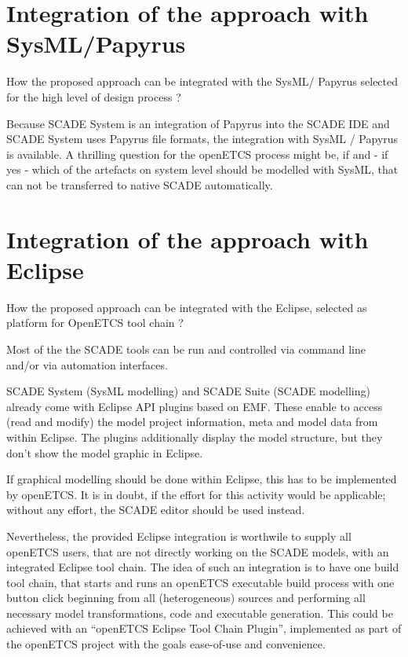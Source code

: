 \section{Integration of the approach with SysML/Papyrus}

\begin{todo_comment}
How the proposed approach can be integrated with the SysML/ Papyrus selected for the high level of design process ?
\end{todo_comment}

Because SCADE System is an integration of Papyrus into the SCADE IDE and SCADE System uses Papyrus file formats, the integration with SysML / Papyrus is available.
A thrilling question for the openETCS process might be, if and - if yes - which of the artefacts on system level should be modelled with SysML, that can not be transferred to native SCADE automatically. 

\section{Integration of the approach with Eclipse}

\begin{todo_comment}
How the proposed approach can be integrated with the Eclipse, selected as platform for OpenETCS tool chain ?
\end{todo_comment}

Most of the the SCADE tools can be run and controlled via command line and/or via automation interfaces. 

SCADE System (SysML modelling) and SCADE Suite (SCADE modelling) already come with Eclipse API plugins based on EMF. These enable to access (read and modify) the model project information, meta and model data from within Eclipse. 
The plugins additionally display the model structure, but they don't show the model graphic in Eclipse. 

If graphical modelling should be done within Eclipse, this has to be implemented by openETCS. It is in doubt, if the effort for this activity would be applicable; without any effort, the SCADE editor should be used instead. 
 
Nevertheless, the provided Eclipse integration is worthwile to supply all openETCS users, that are not directly working on the SCADE models, with an integrated Eclipse tool chain. 
The idea of such an integration is to have one build tool chain, that starts and runs an openETCS executable build process with one button click beginning from all (heterogeneous) sources and performing all necessary model transformations, code and executable generation. 
This could be achieved with an "`openETCS Eclipse Tool Chain Plugin"', implemented as part of the openETCS project with the goals ease-of-use and convenience. 

